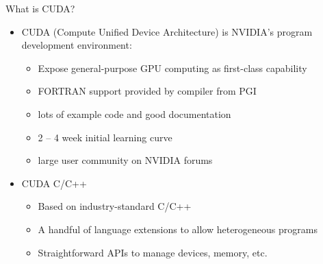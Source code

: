 \documentclass[10pt,times]{beamer}
\begin{document}
\begin{frame}{What is CUDA?}

\begin{itemize}
\item CUDA (Compute Unified Device Architecture) is NVIDIA’s program
development environment:
\begin{itemize}
\item Expose general-purpose GPU computing as first-class capability
\item FORTRAN support provided by compiler from PGI
\item lots of example code and good documentation 
\item 2 -- 4 week initial learning curve
\item large user community on NVIDIA forums 
\end{itemize}
\item CUDA C/C++
\begin{itemize}
\item Based on industry-standard C/C++
\item A handful of language extensions to allow heterogeneous programs
\item Straightforward APIs to manage devices, memory, etc.

\end{itemize}

\end{itemize}
\end{frame}
\end{document}
